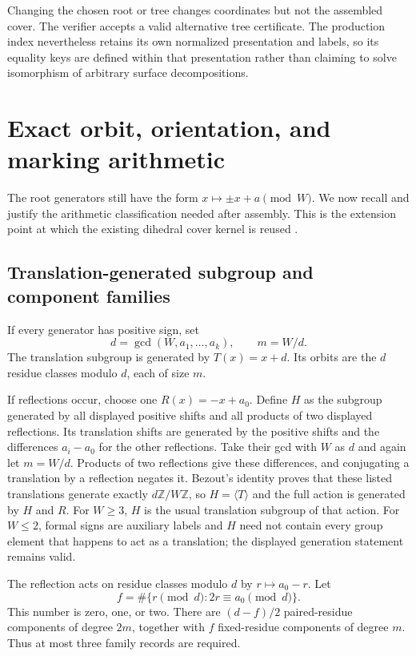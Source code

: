 \documentclass[11pt,a4paper]{article}
\theoremstyle{definition}\newtheorem{definition}[theorem]{Definition}
\theoremstyle{remark}\newtheorem{remark}[theorem]{Remark}
\newcommand{\Z}{\mathbb Z}
\begin{document}
Changing the chosen root or tree changes coordinates but not the assembled
cover. The verifier accepts a valid alternative tree certificate. The
production index nevertheless retains its own normalized presentation and
labels, so its equality keys are defined within that presentation rather
than claiming to solve isomorphism of arbitrary surface decompositions.

\section{Exact orbit, orientation, and marking arithmetic}
\label{sec:orbits}

The root generators still have the form $x\mapsto\pm x+a\pmod W$.
We now recall and justify the arithmetic classification needed after
assembly. This is the extension point at which the existing dihedral
cover kernel is reused \cite{repo}.

\subsection{Translation-generated subgroup and component families}

If every generator has positive sign, set
\[
 d=\gcd(W,a_1,\ldots,a_k),\qquad m=W/d.
\]
The translation subgroup is generated by $T(x)=x+d$. Its orbits are the
$d$ residue classes modulo $d$, each of size $m$.

If reflections occur, choose one $R(x)=-x+a_0$. Define $H$ as the subgroup
generated by all displayed positive shifts and all products of two
displayed reflections. Its translation shifts are generated by the
positive shifts and the differences $a_i-a_0$ for the other reflections.
Take their gcd with $W$ as $d$ and again let $m=W/d$.
Products of two reflections give these differences, and conjugating a
translation by a reflection negates it. Bezout's identity proves that these
listed translations generate exactly $d\Z/W\Z$, so $H=\langle T\rangle$
and the full action is generated by $H$ and $R$. For $W\ge3$, $H$ is the
usual translation subgroup of that action. For $W\le2$, formal signs are
auxiliary labels and $H$ need not contain every group element that happens
to act as a translation; the displayed generation statement remains valid.

The reflection acts on residue classes modulo $d$ by
$r\mapsto a_0-r$. Let
\[
 f=\#\{r\pmod d:2r\equiv a_0\pmod d\}.
\]
This number is zero, one, or two. There are $(d-f)/2$ paired-residue
components of degree $2m$, together with $f$ fixed-residue components of
degree $m$. Thus at most three family records are required.
\end{document}
